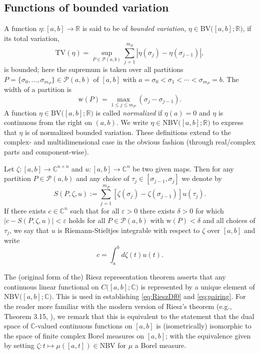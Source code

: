 \documentclass[a4paper, 12pt, oneside, reqno, notitlepage]{amsart}
\theoremstyle{plain}
\theoremstyle{definition}
\theoremstyle{remark}
\newcommand{\nbv}{\mathrm{NBV}}
\newcommand{\bv}{\mathrm{BV}}
\begin{document}
\subsection{Functions of bounded variation}
\label{sect:BV}

A function $\eta:[a,b] \to \mathbb{R}$ is said to be of \textit{bounded variation}, $\eta \in \bv\big([a,b];\mathbb{R}\big)$, if its total variation,
\begin{equation}
    \mathrm{TV}(\eta) = \sup_{P \in \mathcal{P}(a,b)} \sum_{j=1}^{m_P} |\eta(\sigma_j)-\eta(\sigma_{j-1})|,
    \label{eq:TV}
\end{equation}
is bounded; here the supremum is taken over all partitions $P = \{ \sigma_0,\ldots,\sigma_{m_P} \} \in \mathcal{P}(a,b)$ of $[a,b]$ with $a = \sigma_0 < \sigma_1<\cdots<\sigma_{m_P}=b$.
The width of a partition is
\begin{displaymath}
    \mathrm{w}(P) = \max_{1\leq j \leq m_P} (\sigma_j-\sigma_{j-1}).
\end{displaymath}
A function $\eta \in \bv\big([a,b];\mathbb{R}\big)$ is called \textit{normalized} if $\eta(a) = 0$ and $\eta$ is continuous from the right on $(a,b)$.
We write $\eta \in \nbv\big([a,b];\mathbb{R}\big)$ to express that $\eta$ is of normalized bounded variation.
These definitions extend to the complex- and multidimensional case in the obvious fashion (through real/complex parts and component-wise).



Let $\zeta :[a,b] \to \mathbb{C}^{n \times n}$ and $u : [a,b]\to \mathbb{C}^{n}$ be two given maps.
Then for any partition $P \in \mathcal{P}(a,b)$ and any choice of $\tau_j \in [\sigma_{j-1},\sigma_j]$ we denote by
\begin{displaymath}
    S(P,\zeta,u) := \sum_{j=1}^{m_P} [\zeta(\sigma_j)-\zeta(\sigma_{j-1})]u(\tau_j).
\end{displaymath}
If there exists $c \in \mathbb{C}^n$ such that for all $\varepsilon > 0$ there exists $\delta>0$ for which $|c-S(P,\zeta,u)| < \varepsilon$ holds for all $P \in \mathcal{P}(a,b)$ with $\mathrm{w}(P) < \delta$ and all choices of $\tau_j $, we say that $u$ is Riemann-Stieltjes integrable with respect to $\zeta$ over $[a,b]$ and write
\begin{displaymath}
    c = \int_a^b d\zeta(t) u(t).
\end{displaymath}

The (original form of the) Riesz representation theorem \cite{Riesz1909Sur} asserts that any continuous linear functional on $C \big( [a,b]; \mathbb{C} \big)$ is represented by a unique element of $\nbv \big( [a,b] ;\mathbb{C}\big)$.
This is used in establishing \eqref{eq:RieszDf0} and \eqref{eq:pairing}. 
For the reader more familiar with the modern version of Riesz's theorem (e.g., Theorem 3.15, \cite{salamon2016measure}), we remark that this is equivalent to the statement that the dual space of $\mathbb{C}$-valued continuous functions on $[a,b]$ is (isometrically) isomorphic to the space of finite complex Borel measures on $[a,b]$; with the equivalence given by setting $\zeta: t \mapsto \mu([a,t]) \in \nbv$ for $\mu$ a Borel measure.
\end{document}
